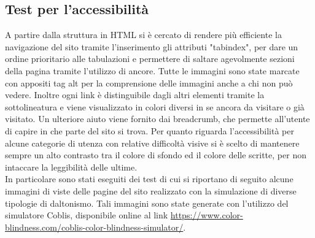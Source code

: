 \subsection{Test per l'accessibilità}
A partire dalla struttura in HTML si è cercato di rendere più efficiente la navigazione del sito tramite l'inserimento gli attributi "tabindex", per dare un ordine prioritario alle tabulazioni e permettere di saltare agevolmente sezioni della pagina tramite l'utilizzo di ancore. Tutte le immagini sono state marcate con appositi tag alt per la comprensione delle immagini anche a chi non può vedere. Inoltre ogni link è distinguibile dagli altri elementi tramite la sottolineatura e viene visualizzato in colori diversi in se ancora da visitare o già visitato. Un ulteriore aiuto viene fornito dai breadcrumb, che permette all'utente di capire in che parte del sito si trova. Per quanto riguarda l'accessibilità per alcune categorie di utenza con relative difficoltà visive si è scelto di mantenere sempre un alto contrasto tra il colore di sfondo ed il colore delle scritte, per non intaccare la leggibilità delle ultime.\\
In particolare sono stati eseguiti dei test di cui si riportano di seguito alcune immagini di viste delle pagine del sito realizzato con la simulazione di diverse tipologie di daltonismo. Tali immagini sono state generate con l'utilizzo del simulatore Coblis, disponibile online al link \url{https://www.color-blindness.com/coblis-color-blindness-simulator/}.\\


